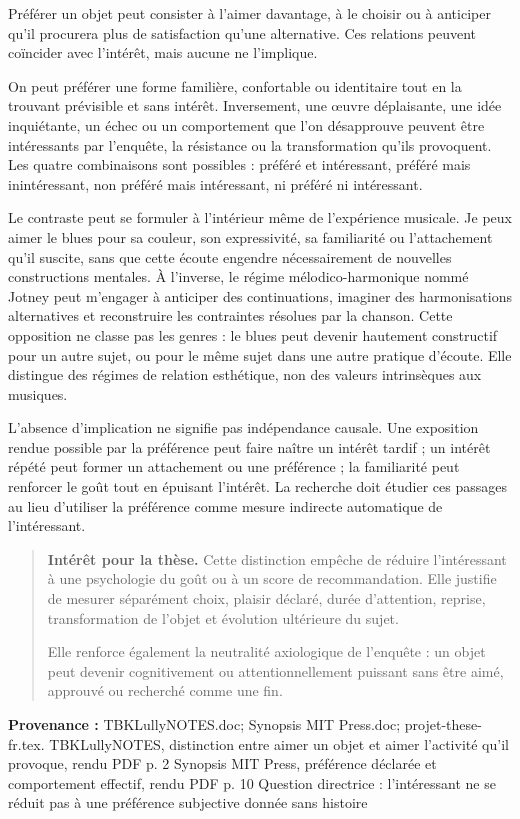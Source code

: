 \documentclass[10pt,a4paper]{article}
\begin{document}
Préférer un objet peut consister à l'aimer davantage, à le choisir ou à anticiper qu'il procurera plus de satisfaction qu'une alternative. Ces relations peuvent coïncider avec l'intérêt, mais aucune ne l'implique.

On peut préférer une forme familière, confortable ou identitaire tout en la trouvant prévisible et sans intérêt. Inversement, une œuvre déplaisante, une idée inquiétante, un échec ou un comportement que l'on désapprouve peuvent être intéressants par l'enquête, la résistance ou la transformation qu'ils provoquent. Les quatre combinaisons sont possibles : préféré et intéressant, préféré mais inintéressant, non préféré mais intéressant, ni préféré ni intéressant.

Le contraste peut se formuler à l'intérieur même de l'expérience musicale. Je peux aimer le blues pour sa couleur, son expressivité, sa familiarité ou l'attachement qu'il suscite, sans que cette écoute engendre nécessairement de nouvelles constructions mentales. À l'inverse, le régime mélodico-harmonique nommé Jotney peut m'engager à anticiper des continuations, imaginer des harmonisations alternatives et reconstruire les contraintes résolues par la chanson. Cette opposition ne classe pas les genres : le blues peut devenir hautement constructif pour un autre sujet, ou pour le même sujet dans une autre pratique d'écoute. Elle distingue des régimes de relation esthétique, non des valeurs intrinsèques aux musiques.

L'absence d'implication ne signifie pas indépendance causale. Une exposition rendue possible par la préférence peut faire naître un intérêt tardif ; un intérêt répété peut former un attachement ou une préférence ; la familiarité peut renforcer le goût tout en épuisant l'intérêt. La recherche doit étudier ces passages au lieu d'utiliser la préférence comme mesure indirecte automatique de l'intéressant.

\begin{quote}
\textbf{Intérêt pour la thèse.} Cette distinction empêche de réduire l'intéressant à une psychologie du goût ou à un score de recommandation. Elle justifie de mesurer séparément choix, plaisir déclaré, durée d'attention, reprise, transformation de l'objet et évolution ultérieure du sujet.

Elle renforce également la neutralité axiologique de l'enquête : un objet peut devenir cognitivement ou attentionnellement puissant sans être aimé, approuvé ou recherché comme une fin.
\end{quote}
{\footnotesize\color{metadata}\textbf{Provenance :} TBKLullyNOTES.doc; Synopsis MIT Press.doc; projet-these-fr.tex. TBKLullyNOTES, distinction entre aimer un objet et aimer l'activité qu'il provoque, rendu PDF p. 2 Synopsis MIT Press, préférence déclarée et comportement effectif, rendu PDF p. 10 Question directrice : l'intéressant ne se réduit pas à une préférence subjective donnée sans histoire\par}
\end{document}
